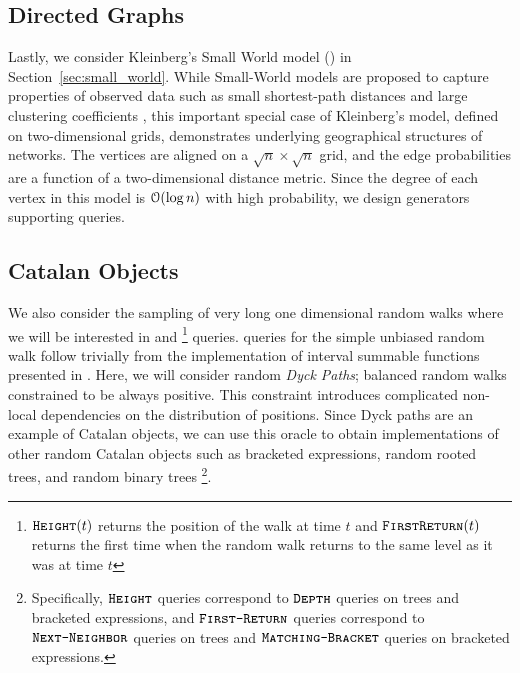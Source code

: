 \subsection{Directed Graphs}
\label{sec:directed_graphs}
Lastly, we consider Kleinberg's Small World model (\cite{kleinberg, klein}) in Section~\ref{sec:small_world}.
While Small-World models are proposed to capture 
properties of observed data such as small shortest-path 
distances and large clustering coefficients \cite{watts1998collective}, 
this important special case of Kleinberg's model, defined on two-dimensional grids, 
demonstrates underlying geographical structures of networks. 
The vertices are aligned on a $\sqrt{n}\times\sqrt{n}$ grid,
and the edge probabilities are a function of a two-dimensional distance metric.
Since the degree of each vertex in this model is $\Bo(\log n)$ with high probability,
we design generators supporting  queries.




\subsection{Catalan Objects}%
\label{sub:catalan_objects}
We also consider the sampling of very long one dimensional random walks where we will be interested in  and 
\footnote{$\texttt{\textsc{Height}}(t)$ returns the position of the walk at time $t$
and $\texttt{\textsc{FirstReturn}}(t)$ returns the first time when the random walk returns to the same level as it was at time $t$} queries.
 queries for the simple unbiased random walk follow trivially from the implementation of interval summable functions presented in \cite{huge}.
Here, we will consider random \emph{Dyck Paths}; balanced random walks constrained to be always positive.
This constraint introduces complicated non-local dependencies on the distribution of positions.
Since Dyck paths are an example of Catalan objects, we can use this oracle to obtain implementations of other random Catalan objects
such as bracketed expressions, random rooted trees, and random binary trees
\footnote{Specifically, $\texttt{\textsc{Height}}$ queries correspond to $\texttt{\textsc{Depth}}$ queries on trees and bracketed expressions,
and $\texttt{\textsc{First-Return}}$ queries correspond to $\texttt{\textsc{Next-Neighbor}}$ queries on trees and $\texttt{\textsc{Matching-Bracket}}$ queries on bracketed expressions.
}.




